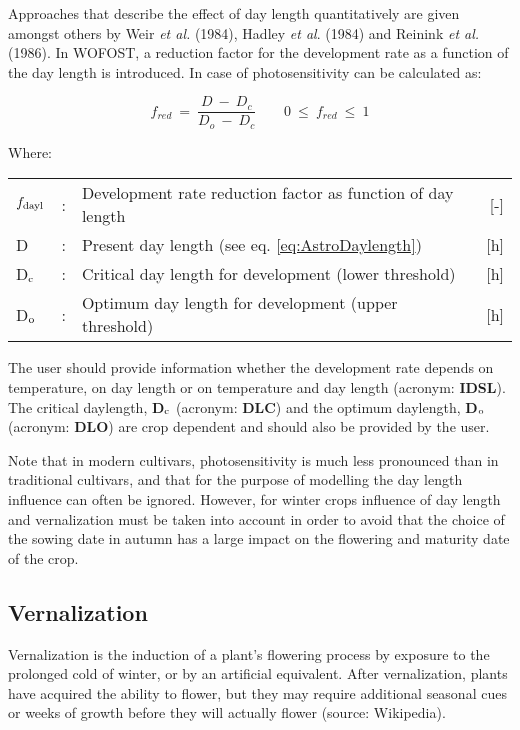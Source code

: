 Approaches that describe the effect of day length 
quantitatively are given amongst others by  Weir {\it et al.} (1984), Hadley {\it et al}. (1984) 
and Reinink {\it et al.} (1986). In WOFOST, a reduction factor for the development rate as a 
function of the day length is introduced. In case of photosensitivity can be calculated as:

\begin{equation}
\label{eq:5.5}
f_{red} ~=~{\frac{D ~-~D _{c} }{D _{o} ~-~ D _{c} }} ~~~~~~~~~0~\le ~f _{red} ~\le ~1
\end{equation}

Where:\\[5pt]
\begin{tabularx}{\textwidth}{llXr}
	$f_{{\rm dayl}}$ &:& Development rate reduction factor as function of day length   &     [-]\\
	D &:& Present day length (see eq. \ref{eq:AstroDaylength})   &     [h]\\
	D$_{{\rm c}}$ &:& Critical day length for development (lower threshold)    &    [h]\\
	D$_{{\rm o}}$ &:& Optimum day length for development (upper threshold)    &    [h]\\
\end{tabularx}

The user should provide information whether the development rate depends on temperature, 
on day length or on temperature and day length (acronym: {\bf IDSL}). The critical
daylength, {\bf D$_{{\rm c}}$} (acronym: {\bf DLC}) and the optimum daylength, 
{\bf D$_{{\rm o}}$} (acronym: {\bf DLO}) are crop dependent and should also be provided by 
the user. 

Note that in modern cultivars, photosensitivity is much less pronounced than in traditional
cultivars, and that for the purpose of modelling the day length influence can often be ignored.
However, for winter crops influence of day length and vernalization must be taken into
account in order to avoid that the choice of the sowing date in autumn has a large impact on 
the flowering and maturity date of the crop.


\subsection{Vernalization}

Vernalization is the induction of a plant's flowering process by exposure to the prolonged cold of winter, or by an artificial equivalent. After vernalization, plants have acquired the ability to flower, but they may require additional seasonal cues or weeks of growth before they will actually flower (source: Wikipedia). 

